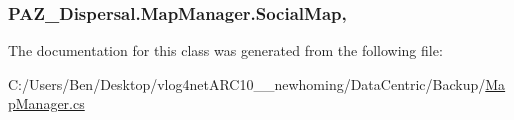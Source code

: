 \hypertarget{class_p_a_z___dispersal_1_1_map_manager_aa28bad04a98c0e53ab03c435ae31f6aa}{
\subsubsection[{Social\-Map}]{ P\-A\-Z\-\_\-\-Dispersal.\-Map\-Manager.\-Social\-Map\hspace{0.3cm}{\ttfamily [get]}, {\ttfamily [set]}}}\label{class_p_a_z___dispersal_1_1_map_manager_aa28bad04a98c0e53ab03c435ae31f6aa}


The documentation for this class was generated from the following file\-:\begin{DoxyCompactItemize}
\item 
C\-:/\-Users/\-Ben/\-Desktop/vlog4net\-A\-R\-C10\-\_\-\_\-newhoming/\-Data\-Centric/\-Backup/\hyperlink{_backup_2_map_manager_8cs}{Map\-Manager.\-cs}\end{DoxyCompactItemize}
